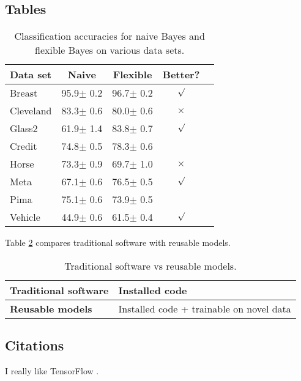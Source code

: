 \documentclass{article}
\begin{document}
\subsection{Tables}

\begin{table}[t]
  \caption{Classification accuracies for naive Bayes and flexible
    Bayes on various data sets.}
  \label{sample-table}
  \begin{center}
    \begin{small}
      \begin{sc}
        \begin{tabular}{lcccr}
          \toprule
          Data set & Naive & Flexible & Better? \\
          \midrule
          Breast    & 95.9$\pm$ 0.2& 96.7$\pm$ 0.2& $\surd$ \\
          Cleveland & 83.3$\pm$ 0.6& 80.0$\pm$ 0.6& $\times$\\
          Glass2    & 61.9$\pm$ 1.4& 83.8$\pm$ 0.7& $\surd$ \\
          Credit    & 74.8$\pm$ 0.5& 78.3$\pm$ 0.6&         \\
          Horse     & 73.3$\pm$ 0.9& 69.7$\pm$ 1.0& $\times$\\
          Meta      & 67.1$\pm$ 0.6& 76.5$\pm$ 0.5& $\surd$ \\
          Pima      & 75.1$\pm$ 0.6& 73.9$\pm$ 0.5&         \\
          Vehicle   & 44.9$\pm$ 0.6& 61.5$\pm$ 0.4& $\surd$ \\
          \bottomrule
        \end{tabular}
      \end{sc}
    \end{small}
  \end{center}
  \vskip -0.1in
\end{table}

Table \ref{software-vs-models} compares traditional software with
reusable models.

\begin{table}[h!]
  \begin{center}
    \caption{Traditional software vs reusable models.}
    \label{software-vs-models}
    \begin{small}
      \begin{tabular}{l|l}
        \toprule
        \textbf{Traditional software} & Installed code \\ \hline
        \textbf{Reusable models} & Installed code + trainable on novel data \\
        \bottomrule
      \end{tabular}
    \end{small}
  \end{center}
\end{table}

\subsection{Citations}

I really like TensorFlow \cite{tensorflow2015-whitepaper}.



\end{document}
